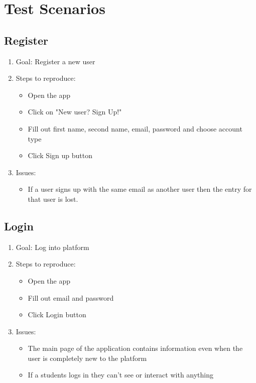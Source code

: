 \section{Test Scenarios}
\subsection{Register}
\begin{enumerate}
    \item Goal: Register a new user
    \item Steps to reproduce:
        \begin{itemize}
            \item Open the app
            \item Click on "New user? Sign Up!"
            \item Fill out first name, second name, email, password and choose account type
            \item Click Sign up button
        \end{itemize}
    \item Issues:
        \begin{itemize}
            \item If a user signs up with the same email as another user then the entry for that user is lost.
        \end{itemize}
\end{enumerate}

\subsection{Login}
\begin{enumerate}
    \item Goal: Log into platform
    \item Steps to reproduce:
        \begin{itemize}
            \item Open the app
            \item Fill out email and password
            \item Click Login button
        \end{itemize}
    \item Issues:
        \begin{itemize}
            \item The main page of the application contains information even when the user is completely new to the platform
            \item If a students logs in they can't see or interact with anything
        \end{itemize}
\end{enumerate}


